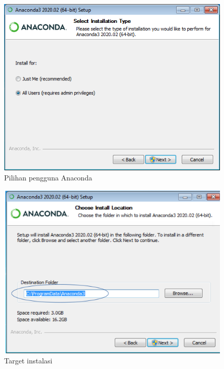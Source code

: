 \begin{figure}
  \begin{center}
    \includegraphics[scale=.5]{pics/anacondaInstall3.png}
    \caption{Pilihan pengguna Anaconda}
    \label{fig:pengguna}
  \end{center}
\end{figure}

\begin{figure}
  \begin{center}
    \includegraphics[scale=.5]{pics/anacondaInstall4a.png}
    \caption{Target instalasi}
    \label{fig:target}
  \end{center}
\end{figure}


